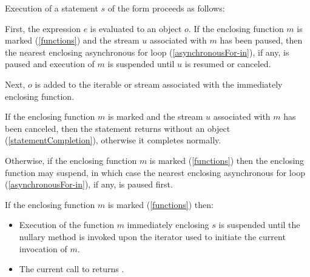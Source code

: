 \documentclass[makeidx]{article}
\begin{document}
{\LMHash{}%
Execution of a statement $s$ of the form 
proceeds as follows:

\LMHash{}%
First, the expression $e$ is evaluated to an object $o$.
If the enclosing function $m$ is marked \code{\ASYNC*}
(\ref{functions})
and the stream $u$ associated with $m$ has been paused,
then the nearest enclosing asynchronous for loop
(\ref{asynchronousFor-in}),
if any, is paused and execution of $m$ is suspended
until $u$ is resumed or canceled.

\LMHash{}%
Next, $o$ is added to the iterable or stream associated
with the immediately enclosing function.


\LMHash{}%
If the enclosing function $m$ is marked \code{\ASYNC*}
and the stream $u$ associated with $m$ has been canceled,
then the \YIELD{} statement returns without an object
(\ref{statementCompletion}),
otherwise it completes normally.


\LMHash{}%
Otherwise, if the enclosing function $m$ is marked \code{\ASYNC*}
(\ref{functions})
then the enclosing function may suspend,
in which case the nearest enclosing asynchronous for loop
(\ref{asynchronousFor-in}),
if any, is paused first.


\LMHash{}%
If the enclosing function $m$ is marked \code{\SYNC*} (\ref{functions}) then:
\begin{itemize}
\item
  Execution of the function $m$ immediately enclosing $s$ is suspended
  until the nullary method  is invoked upon
  the iterator used to initiate the current invocation of $m$.
\item
  The current call to  returns \TRUE.
\end{itemize}


}
\end{document}
